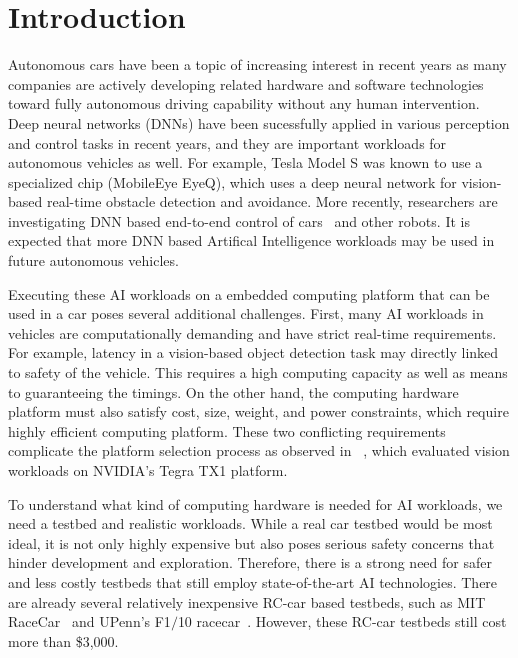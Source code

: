 \section{Introduction} \label{sec:intro}

%
%
Autonomous cars have been a topic of increasing interest in recent
years as many companies are actively developing related hardware
and software technologies toward fully autonomous driving capability without
any human intervention. Deep neural networks (DNNs) have been
sucessfully applied in various perception and control tasks in
recent years, and they are important workloads for autonomous vehicles
as well. For example, Tesla Model S was known to use a specialized
chip (MobileEye EyeQ), which uses a deep neural network for vision-based
real-time obstacle detection and avoidance. More recently, researchers
are investigating DNN based end-to-end control of
cars~\cite{Bojarski2016} and other robots. It is expected that more
DNN based Artifical Intelligence workloads may be used in future
autonomous vehicles.

Executing these AI workloads on a embedded computing platform that can
be used in a car poses several additional challenges. First, many AI
workloads in vehicles are computationally demanding and have strict
real-time requirements. For example, latency in a vision-based object
detection task may directly linked to safety of the vehicle. This
requires a high computing capacity as well as means to guaranteeing
the timings. On the other hand, the computing hardware platform must
also satisfy cost, size, weight, and power constraints, which require
highly efficient computing platform. These two conflicting
requirements  complicate the platform selection process as observed in
~\cite{Otterness2017}, which evaluated vision workloads on
NVIDIA's Tegra TX1 platform.


To understand what kind of computing hardware is needed for AI
workloads, we need a testbed and realistic workloads. While a real car
testbed would be most ideal, it is not only highly expensive but also
poses serious safety concerns that hinder development and exploration.
Therefore, there is a strong need for safer and less costly testbeds
that still employ state-of-the-art AI technologies. There are already
several relatively inexpensive RC-car based testbeds, such as MIT
RaceCar~\cite{shin2017project} and UPenn's F1$/$10 racecar~\cite{upennf1tenth}.
However, these RC-car testbeds still cost more than \$3,000.

